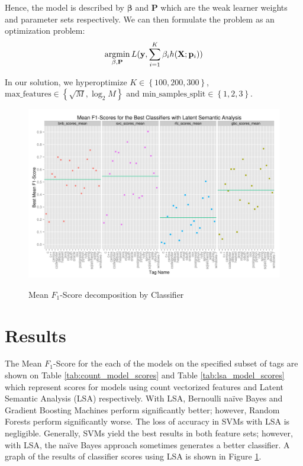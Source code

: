 \documentclass{sig-alternate}
\newcommand{\Fone}{$F_1$}
\renewcommand{\vec}[1]{\mathbf{#1}}
\newcommand{\argmin}{\operatornamewithlimits{argmin}}
\begin{document}
		Hence, the model is described by $\vec{\beta}$ and $\vec{P}$ which are the
		weak learner weights and parameter sets respectively. We can then formulate
		the problem as an optimization problem:
		\[
			\argmin_{\vec{\beta}, \vec{P}} L(\vec{y}, \sum_{i=1}^K \beta_i h(\vec{X}; \vec{p}_i))
		\]

		In our solution, we hyperoptimize $K \in \left\{100, 200, 300\right\}$,
		$\text{max\_features} \in \left\{\sqrt{M}, \log_2{M}\right\}$ and
		$\text{min\_samples\_split} \in \left\{1, 2, 3\right\}$.

\begin{figure}[htb!]
	\centering
	\includegraphics[width=\textwidth]{decomposition}
	\label{fig:decomposition}
	\caption{Mean \Fone-Score decomposition by Classifier}
\end{figure}

\section{Results} %
\label{sec:Results}
	The Mean \Fone-Score for the each of the models on the specified subset of
	tags are shown on Table \ref{tab:count_model_scores} and Table
	\ref{tab:lsa_model_scores} which represent scores for models using count
	vectorized features and Latent Semantic Analysis (LSA) respectively. With
	LSA, Bernoulli na\"{i}ve Bayes and Gradient Boosting Machines perform
	significantly better; however, Random Forests perform significantly worse.
	The loss of accuracy in SVMs with LSA is negligible. Generally, SVMs yield
	the best results in both feature sets; however, with LSA, the na\"{i}ve
	Bayes approach sometimes generates a better classifier. A graph of the
	results of classifier scores using LSA is shown in Figure
	\ref{fig:decomposition}.
\end{document}
